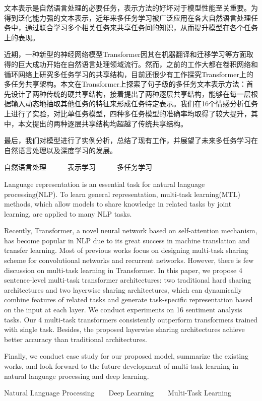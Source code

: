 \begin{cabstract}
	文本表示是自然语言处理的必要任务，表示方法的好坏对于模型性能至关重要。为得到泛化能力强的文本表示，近年来多任务学习被广泛应用在各大自然语言处理任务中，通过联合学习多个相关任务来共享任务间的知识，从而提升模型在各个任务上的表现。
	
	近期，一种新型的神经网络模型Transformer因其在机器翻译和迁移学习等方面取得的巨大成功开始在自然语言处理领域流行。然而，之前的工作大都在卷积网络和循环网络上研究多任务学习的共享结构，目前还很少有工作探究Transformer上的多任务共享架构。本文在Transformer上探索了句子级的多任务文本表示方法：首先设计了两种传统的硬共享结构，接着提出了两种逐层共享结构，能够在每一层根据输入动态地抽取其他任务的特征来形成任务特定表示。我们在16个情感分析任务上进行了实验，对比单任务模型，四种多任务模型的准确率均取得了较大提升，其中，本文提出的两种逐层共享结构均超越了传统共享结构。
	
	最后，我们对模型进行了实例分析，总结了现有工作，并展望了未来多任务学习在自然语言处理以及深度学习的发展。
\end{cabstract}


\begin{ckeywords}
	自然语言处理\ \ \ \ \ \ 表示学习\ \ \ \ \ \ 多任务学习
\end{ckeywords}



\begin{eabstract}
	Language representation is an essential task for natural language processing(NLP). To learn general representation, multi-task learning(MTL) methods, which allow models to share knowledge in related tasks by joint learning, are applied to many NLP tasks.
	
	Recently, Transformer, a novel neural network based on self-attention mechanism, has become popular in NLP due to its great success in machine translation and transfer learning. Most of previous works focus on designing multi-task sharing scheme for convolutional networks and recurrent networks. However, there is few discussion on multi-task learning in Transformer. In this paper, we propose 4 sentence-level multi-task transformer architectures: two traditional hard sharing architectures and two layerwise sharing architectures, which can dynamically combine features of related tasks and generate task-specific representation based on the input at each layer. We conduct experiments on 16 sentiment analysis tasks. Our 4 multi-task transformers consistently outperform transformers trained with single task. Besides, the proposed layerwise sharing architectures achieve better accuracy than traditional architectures.
	
	Finally, we conduct case study for our proposed model, summarize the existing works, and look forward to the future development of multi-task learning in natural language processing and deep learning.
	
	
\end{eabstract}


\begin{ekeywords}
	Natural Language Processing\ \ \ \ Deep Learning\ \ \ \ Multi-Task Learning
\end{ekeywords}


